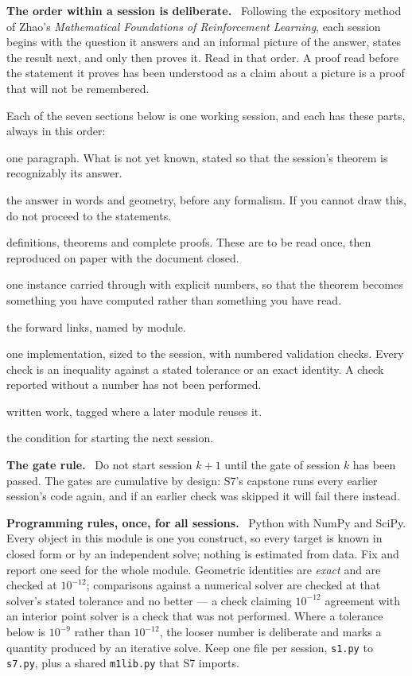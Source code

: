 \documentclass[11pt,a4paper]{article}
\newcommand{\mpart}[1]{\smallskip\noindent\textbf{#1}\ \ignorespaces}
\theoremstyle{definition}
\theoremstyle{plain}
\theoremstyle{remark}
\begin{document}
\mpart{The order within a session is deliberate.} Following the expository method of Zhao's
\emph{Mathematical Foundations of Reinforcement Learning}, each session begins with the
question it answers and an informal picture of the answer, states the result next, and only
then proves it. Read in that order. A proof read before the statement it proves has been
understood as a claim about a picture is a proof that will not be remembered.

Each of the seven sections below is one working session, and each has these parts, always in
this order:

\begin{description}[leftmargin=1.9cm,style=nextline,font=\normalfont\itshape]
\item[The question] one paragraph. What is not yet known, stated so that the session's theorem
is recognizably its answer.
\item[The picture] the answer in words and geometry, before any formalism. If you cannot draw
this, do not proceed to the statements.
\item[Statements and proofs] definitions, theorems and complete proofs. These are to be read
once, then reproduced on paper with the document closed.
\item[Worked example] one instance carried through with explicit numbers, so that the theorem
becomes something you have computed rather than something you have read.
\item[Where this is used later] the forward links, named by module.
\item[Proof of concept] one implementation, sized to the session, with numbered validation
checks. Every check is an inequality against a stated tolerance or an exact identity. A check
reported without a number has not been performed.
\item[Exercises] written work, tagged where a later module reuses it.
\item[Session gate] the condition for starting the next session.
\end{description}

\mpart{The gate rule.} Do not start session $k+1$ until the gate of session $k$ has been
passed. The gates are cumulative by design: S7's capstone runs every earlier session's code
again, and if an earlier check was skipped it will fail there instead.

\mpart{Programming rules, once, for all sessions.} Python with NumPy and SciPy. Every object in
this module is one you construct, so every target is known in closed form or by an independent
solve; nothing is estimated from data. Fix and report one seed for the whole module. Geometric
identities are \emph{exact} and are checked at $10^{-12}$; comparisons against a numerical
solver are checked at that solver's stated tolerance and no better --- a check claiming
$10^{-12}$ agreement with an interior point solver is a check that was not performed. Where a
tolerance below is $10^{-9}$ rather than $10^{-12}$, the looser number is deliberate and marks
a quantity produced by an iterative solve. Keep one file per session, \texttt{s1.py} to
\texttt{s7.py}, plus a shared \texttt{m1lib.py} that S7 imports.
\end{document}
